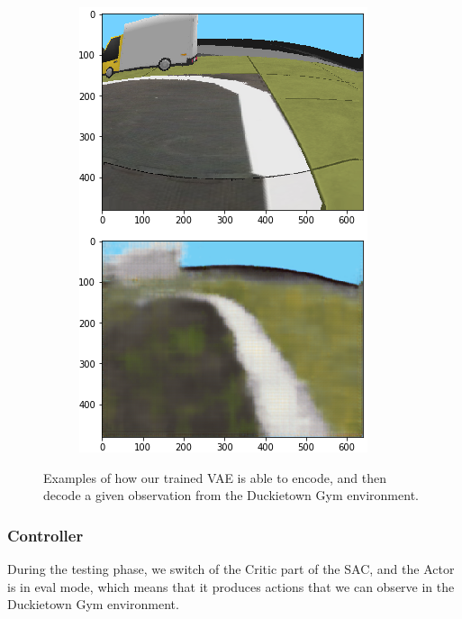 \documentclass{article}
\begin{document}
\begin{figure}[!ht]
\begin{subfigure}[b]{.24\textwidth}
        \includegraphics[width=\textwidth]{vae4.png}
    \end{subfigure}
    \caption{Examples of how our trained VAE is able to encode, and then decode a given observation from the Duckietown Gym environment.}
    \label{fig:trained_vae}
\end{figure}

\subsubsection{Controller}
During the testing phase, we switch of the Critic part of the SAC, and the Actor is in eval mode, which means that it produces actions that we can observe in the Duckietown Gym environment.
\end{document}
